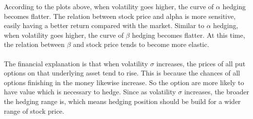 \documentclass[12pt]{article}
\begin{document}
According to the plots above, when volatility goes higher, the curve of $\alpha$ hedging becomes flatter. The relation between stock price and alpha is more sensitive, 
easily having a better return compared with the market. Similar to $\alpha$ hedging, when volatility goes higher, the curve of $\beta$ hedging becomes flatter. At this time, 
the relation between $\beta$ and stock price tends to become more elastic. 
\\\\
The financial explanation is that when volatility $\sigma$ increases, the prices of all put options on that underlying asset tend to rise. This is because the chances 
of all options finishing in the money likewise increase. So the option are more likely to have value which is necessary to hedge. Since as volatility $\sigma$ increases,
the broader the hedging range is, which means hedging position should be build for a wider range of stock price.  
\end{document}
